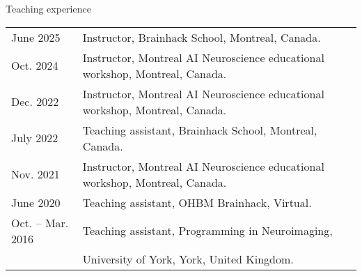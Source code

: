 \documentclass{resume} %
\begin{document}
\begin{rSection}{Teaching experience}

\begin{tabular}{@{} l l @{\hspace{6ex}}}
  June 2025 & Instructor, Brainhack School, Montreal, Canada.\\
  Oct. 2024 & Instructor, Montreal AI Neuroscience educational workshop, Montreal, Canada.\\
  Dec. 2022 & Instructor, Montreal AI Neuroscience educational workshop, Montreal, Canada.\\
  July 2022 & Teaching assistant, Brainhack School, Montreal, Canada.\\
  Nov. 2021 & Instructor, Montreal AI Neuroscience educational workshop, Montreal, Canada.\\
  June 2020 & Teaching assistant, OHBM Brainhack, Virtual.\\
  Oct. -- Mar. 2016 & Teaching assistant, Programming in Neuroimaging, \\
  & University of York, York, United Kingdom.\\
\end{tabular}
\end{rSection}




 	
 	

\end{document}
